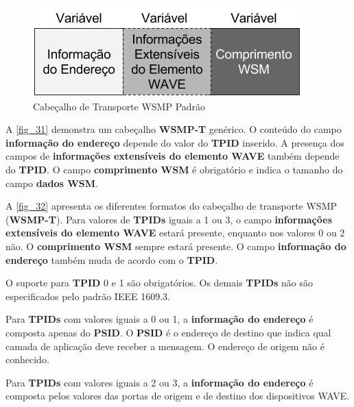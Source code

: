 \documentclass[
12pt,				%
openright,			%
oneside,			%
a4paper,			%
brazil,				%
]{abntex2}
\begin{document}
	\begin{figure} [H]
		\centering
		\includegraphics[scale=.6]{figuras/cap3/31CabecalhoDeTransporteWSMPPadrao}
		\caption{\label{fig_31}Cabeçalho de Transporte WSMP Padrão}
	\end{figure}
	
	\par A \autoref{fig_31} demonstra um cabeçalho \textbf{WSMP-T} genérico. O conteúdo do campo \textbf{informação do endereço} depende do valor do \textbf{TPID} inserido. A presença dos campos de \textbf{informações extensíveis do elemento WAVE} também depende do \textbf{TPID}. O campo \textbf{comprimento WSM} é obrigatório e indica o tamanho do campo \textbf{dados WSM}.
	
	\par A \autoref{fig_32} apresenta os diferentes formatos do cabeçalho de transporte WSMP (\textbf{WSMP-T}). Para valores de \textbf{TPIDs} iguais a 1 ou 3, o campo \textbf{informações extensíveis do elemento WAVE} estará presente, enquanto nos valores 0 ou 2 não. O \textbf{comprimento WSM} sempre estará presente. O campo \textbf{informação do endereço} também muda de acordo com o \textbf{TPID}.
	
	\par O suporte para \textbf{TPID} 0 e 1 são obrigatórios. Os demais \textbf{TPIDs} não são especificados pelo padrão IEEE 1609.3.
	
	\par Para \textbf{TPIDs} com valores iguais a 0 ou 1, a \textbf{informação do endereço} é composta apenas do \textbf{PSID}. O \textbf{PSID} é o endereço de destino que indica qual camada de aplicação deve receber a mensagem. O endereço de origem não é conhecido.
	
	\par Para \textbf{TPIDs} com valores iguais a 2 ou 3, a \textbf{informação do endereço} é composta pelos valores das portas de origem e de destino dos dispositivos WAVE. 
	
\end{document}
